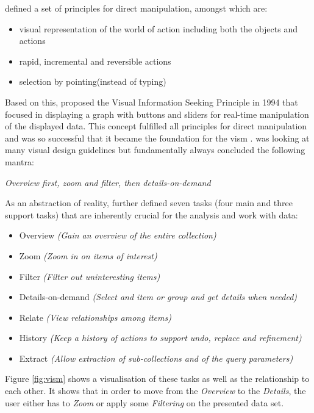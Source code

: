 \cite{Shneiderman2005} defined a set of principles for direct manipulation, amongst which are:
\begin{itemize}[noitemsep,nolistsep]
	\item visual representation of the world of action including both the objects and actions
	\item rapid, incremental and reversible actions
	\item selection by pointing(instead of typing)
\end{itemize}
Based on this, \cite{Ahlberg1994} proposed the Visual Information Seeking Principle in 1994 that focused in displaying a graph with buttons and sliders for real-time manipulation of the displayed data. This concept fulfilled all principles for direct manipulation and was so successful that it became the foundation for the \gls{vism} \citep{Shneiderman1996}. \cite{Shneiderman1996} was looking at many visual design guidelines but fundamentally always concluded the following mantra:
\begin{framed}
	\textit{Overview first, zoom and filter, then details-on-demand}
\end{framed}
As an abstraction of reality, \cite{Shneiderman1996} further defined seven tasks (four main and three support tasks) that are inherently crucial for the analysis and work with data:
\begin{itemize}[noitemsep,nolistsep]
	\item Overview \textit{(Gain an overview of the entire collection)}
	\item Zoom \textit{(Zoom in on items of interest)}
	\item Filter \textit{(Filter out uninteresting items)}
	\item Details-on-demand \textit{(Select and item or group and get details when needed)}
	\item Relate \textit{(View relationships among items)}
	\item History \textit{(Keep a history of actions to support undo, replace and refinement)}
	\item Extract \textit{(Allow extraction of sub-collections and of the query parameters)}
\end{itemize}
Figure \ref{fig:vism} shows a visualisation of these tasks as well as the relationship to each other. It shows that in order to move from the \textit{Overview} to the \textit{Details}, the user either has to \textit{Zoom} or apply some \textit{Filtering} on the presented data set.

